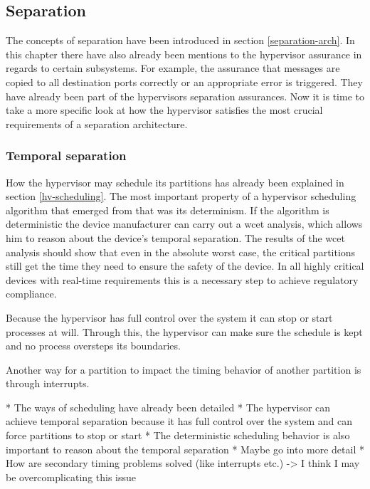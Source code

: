 \subsection{Separation}
The concepts of separation have been introduced in section \ref{separation-arch}. In this chapter there have also already been mentions to the hypervisor assurance in regards to certain subsystems. For example, the assurance that messages are copied to all destination ports correctly or an appropriate error is triggered. They have already been part of the hypervisors separation assurances. Now it is time to take a more specific look at how the hypervisor satisfies the most crucial requirements of a separation architecture. 

\subsubsection{Temporal separation}
How the hypervisor may schedule its partitions has already been explained in section \ref{hv-scheduling}. The most important property of a hypervisor scheduling algorithm that emerged from that was its determinism. If the algorithm is deterministic the device manufacturer can carry out a \acrshort{wcet} analysis, which allows him to reason about the device's temporal separation. The results of the \acrshort{wcet} analysis should show that even in the absolute worst case, the critical partitions still get the time they need to ensure the safety of the device. In all highly critical devices with real-time requirements this is a necessary step to achieve regulatory compliance.

Because the hypervisor has full control over the system it can stop or start processes at will. Through this, the hypervisor can make sure the schedule is kept and no process oversteps its boundaries.

Another way for a partition to impact the timing behavior of another partition is through interrupts. 



* The ways of scheduling have already been detailed
* The hypervisor can achieve temporal separation because it has full control over the system and can force partitions to stop or start
* The deterministic scheduling behavior is also important to reason about the temporal separation
* Maybe go into more detail
* How are secondary timing problems solved (like interrupts etc.)
    -> I think I may be overcomplicating this issue
